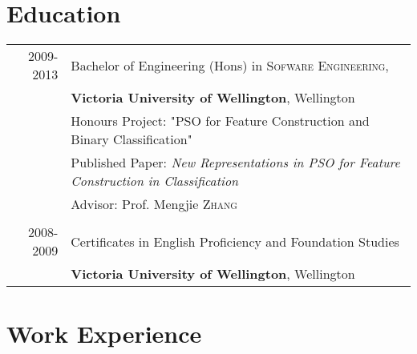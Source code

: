 \documentclass[a4paper,10pt]{article} %
\begin{document}


\section{Education}

\begin{tabular}{rl} 
\textsc{2009-2013} & Bachelor of Engineering (Hons) in \textsc{Sofware Engineering},\\
&\textbf{Victoria University of Wellington}, Wellington\\
& Honours Project: "PSO for Feature Construction and Binary Classification" \\
& Published Paper: \emph{New Representations in PSO for Feature Construction in Classification}\\
& \small Advisor: Prof. Mengjie \textsc{Zhang}\\
& \\


\textsc{2008-2009} & Certificates in English Proficiency and Foundation Studies\\
&\textbf{Victoria University of Wellington}, Wellington\\
\end{tabular}



\section{Work Experience}
\end{document}
